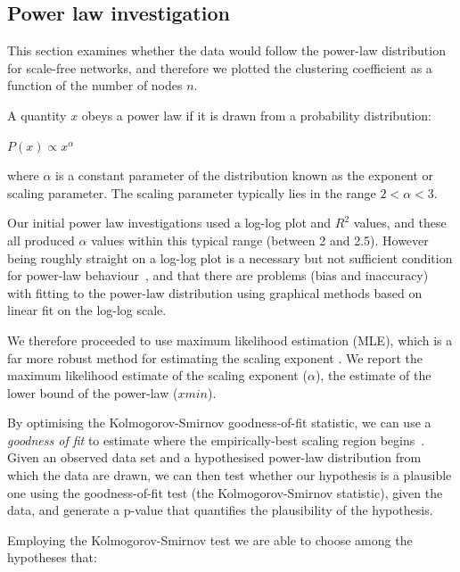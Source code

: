 \documentclass[twocolumn]{svjour3}          %
\theoremstyle{definition}
\begin{document}
\subsection{Power law investigation}\label{sec:powerlaw}

This section examines whether the data would follow the power-law
distribution for scale-free networks, and therefore we plotted the
clustering coefficient as a function of the number of nodes $n$.

\begin{definition}
A quantity $x$ obeys a power law if it is drawn from a probability
distribution:

\begin{center}
$ P(x)\propto x^{\alpha } $
\end{center}

\noindent where $\alpha$ is a constant parameter of the distribution
known as the exponent or scaling parameter. The scaling parameter
typically lies in the range $2 < \alpha < 3$.
\end{definition}

Our initial power law investigations used a log-log plot and $R^2$
values, and these all produced $\alpha$ values within this typical
range (between 2 and 2.5). However being roughly straight on a log-log
plot is a necessary but not sufficient condition for power-law
behaviour~\citep{ClausetShaliziNewman2009}, and that there are problems
(bias and inaccuracy) with fitting to the power-law distribution using
graphical methods based on linear fit on the log-log scale.

We therefore proceeded to use maximum likelihood estimation (MLE),
which is a far more robust method for estimating the scaling exponent
\citep{GoldsteinMorrisYen2004,ClausetShaliziNewman2009}. We report the
maximum likelihood estimate of the scaling exponent ($\alpha$), the
estimate of the lower bound of the power-law ($xmin$).

By optimising the Kolmogorov-Smirnov goodness-of-fit statistic, we can
use a \emph{goodness of fit} to estimate where the empirically-best
scaling region begins~\citep{ClausetShaliziNewman2009}. Given an
observed data set and a hypothesised power-law distribution from which
the data are drawn, we can then test whether our hypothesis is a
plausible one using the goodness-of-fit test (the Kolmogorov-Smirnov
statistic), given the data, and generate a p-value that quantifies the
plausibility of the hypothesis.

Employing the Kolmogorov-Smirnov test we are able to choose among the
hypotheses that: 
\end{document}
